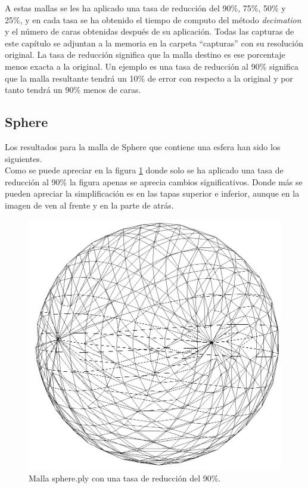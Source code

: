 A estas mallas se les ha aplicado una tasa de reducción del 90\%, 75\%, 50\% y 25\%, y en cada tasa se ha obtenido el tiempo de computo del método \textit{decimation} y el número de caras obtenidas después de su aplicación. Todas las capturas de este capítulo se adjuntan a la memoria en la carpeta ``capturas'' con su resolución original. La tasa de reducción significa que la malla destino es ese porcentaje menos exacta a la original. Un ejemplo es una tasa de reducción al 90\% significa que la malla resultante tendrá un 10\% de error con respecto a la original y por tanto tendrá un 90\% menos de caras.

\newpage
\subsection{Sphere} 
Los resultados para la malla de Sphere que contiene una esfera han sido los siguientes.\\

Como se puede apreciar en la figura \ref{fig:esfera_90.png} donde solo se ha aplicado una tasa de reducción al 90\% la figura apenas se aprecia cambios significativos. Donde más se pueden apreciar la simplificación es en las tapas superior e inferior, aunque en la imagen de ven al frente y en la parte de atrás.\\ 

\begin{figure} %
	\centering
	\includegraphics[scale=0.25]{imagenes/esfera_90.png} 
	\caption{Malla sphere.ply con una tasa de reducción del 90\%.} \label{fig:esfera_90.png}
\end{figure}

